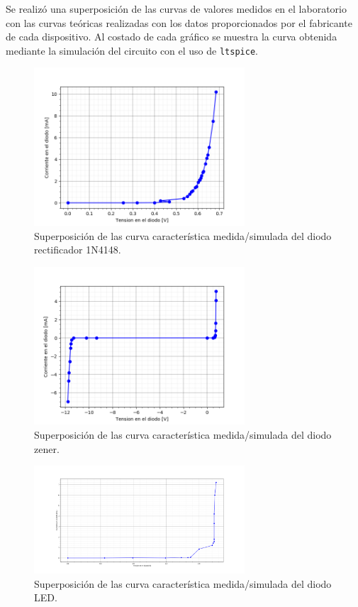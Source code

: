 \documentclass[a4paper]{article}
\begin{document}
Se realizó una superposición de las curvas de valores medidos en el laboratorio con las curvas teóricas realizadas con los datos proporcionados por el fabricante de cada dispositivo. Al costado de cada gráfico se muestra la curva obtenida mediante la simulación del circuito con el uso de \texttt{ltspice}.

\begin{figure}[H]
	\centering
	\includegraphics[width=0.7\textwidth]{CurvaDiodoRectificador.png}
	\caption{Superposición de las curva característica medida/simulada del diodo rectificador 1N4148.}
	\label{fig:diodorect}
\end{figure}

\begin{figure}[H]
	\centering
	\includegraphics[width=0.7\textwidth]{CurvaZenerEntera.png}
	\caption{Superposición de las curva característica medida/simulada del diodo zener.}
	\label{fig:diodozen}
\end{figure}

\begin{figure}[H]
	\centering
	\includegraphics[width=0.7\textwidth]{CurvaDiodosLed.png}
	\caption{Superposición de las curva característica medida/simulada del diodo LED.}
	\label{fig:diodoled}
\end{figure}
\end{document}
